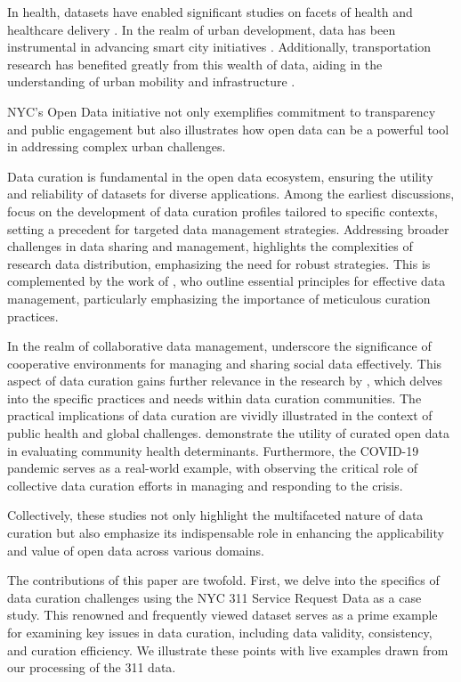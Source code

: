 \documentclass[12pt, titlepage]{article}
\begin{document}
In health, datasets have enabled
significant studies on facets of health and healthcare delivery
\citep{cantor2018facets, shankar2021data}. In the realm of urban
development, data has been instrumental in advancing smart city
initiatives \citep{neves2020impacts}. Additionally, transportation
research has benefited greatly from this wealth of data, aiding in the
understanding of urban mobility and infrastructure
\citep{gerte2019understanding}. 

NYC's Open Data initiative not only
exemplifies commitment to transparency and public engagement but also
illustrates how open data can be a powerful tool in addressing complex
urban challenges.

Data curation is fundamental in the open data ecosystem, ensuring the
utility and reliability of datasets for diverse applications. Among
the earliest discussions, \citet{witt2009constructing} focus on the
development of data curation profiles tailored to specific contexts,
setting a precedent for targeted data management
strategies. Addressing broader challenges in data sharing and
management, \citet{borgman2012conundrum} highlights the complexities
of research data distribution, emphasizing the need for robust
strategies. This is complemented by the work of \citet{hart2016ten},
who outline essential principles for effective data management,
particularly emphasizing the importance of meticulous curation
practices. 

In the realm of collaborative data management,
\citet{beheshti2019datasynapse} underscore the significance of
cooperative environments for managing and sharing social data
effectively. This aspect of data curation gains further relevance in
the research by \citet{mclure2014data}, which delves into the specific
practices and needs within data curation communities. The practical
implications of data curation are vividly illustrated in the context
of public health and global challenges. \citet{cantor2018facets}
demonstrate the utility of curated open data in evaluating community
health determinants. Furthermore, the COVID-19 pandemic serves as a
real-world example, with \citet{shankar2021data} observing the
critical role of collective data curation efforts in managing and
responding to the crisis. 

Collectively, these studies not only highlight the multifaceted nature of data curation but also emphasize
its indispensable role in enhancing the applicability and value of
open data across various domains.

The contributions of this paper are twofold. First, we delve into
the specifics of data curation challenges using the NYC 311 Service
Request Data as a case study. This renowned and frequently viewed 
dataset serves as a prime example for examining key issues in data curation, 
including data validity, consistency, and curation efficiency. 
We illustrate these points with live examples drawn from our processing 
of the 311 data. 
\end{document}
